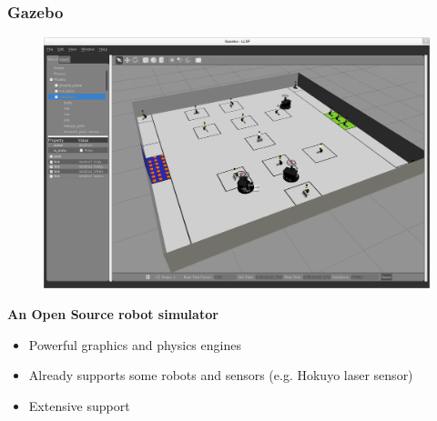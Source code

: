 \documentclass[]{beamer}
\begin{document}
\begin{frame}
  \frametitle{Gazebo}
  \begin{multicols}{2}
    \begin{figure}
      \includegraphics[scale=0.11]{../pics/gazebo_window.png}
    \end{figure}
    \textbf{\large An Open Source robot simulator}
    \begin{itemize}
    \item Powerful graphics and physics engines %
    \item Already supports some robots and sensors (e.g. Hokuyo laser sensor)
    \item Extensive support
    \end{itemize}
  \end{multicols}
\end{frame}
\end{document}

